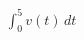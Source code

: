 \documentclass[preview]{standalone}
\begin{document}
\begin{align*}
\int_{0}^{5} v(t) \, dt
\end{align*}
\end{document}

